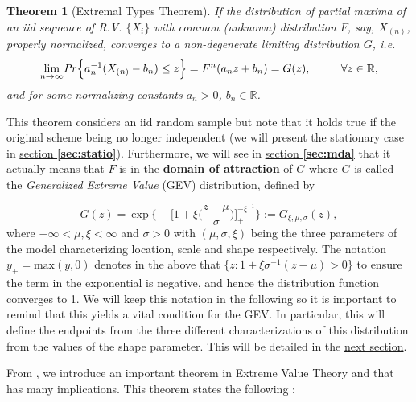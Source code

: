 \documentclass[11pt,a4paper,openany ]{book}
\newtheorem{theorem}{Theorem}[chapter]
\begin{document}
\begin{theorem}[Extremal Types Theorem] \label{extthm}
	If the distribution of partial maxima of an iid sequence of  R.V. $\{X_i\}$ with  common  (unknown)  distribution $F$, say, $X_{(n)}$, properly normalized, converges to a non-degenerate limiting distribution $G$, i.e.
	\begin{equation} \label{exttheom}
	\displaystyle{\lim_{n \to \infty}}\text{\emph{Pr}}\Big\{ a_n^{-1}(X_{(n)}-b_n)\leq z\Big\}=F^n(a_nz+b_n)
	= G(z), \ \ \ \ \ \ \ \ \forall z\in\mathbb{R},
	\end{equation}
	and for some normalizing constants $a_n>0$, $b_n\in\mathbb{R}$.
\end{theorem}
This theorem considers an iid random sample but note that it holds true if the original scheme 
being no longer independent (we will present the stationary case in 
\hyperref[sec:statio]{section \textbf{\ref{sec:statio}}}). %
Furthermore, we will see in \hyperref[sec:mda]{section \textbf{\ref{sec:mda}}} that it actually means that $F$ is in the \textbf{domain of attraction} of $G$ where
$G$ is called the \textit{Generalized Extreme Value} (GEV) distribution, defined by

\begin{equation} \label{gevgen}
G(z)=\ \text{exp}\ \Bigg\{-\bigg[1+\xi\bigg(\frac{z-\mu}{\sigma}\bigg)\bigg]_+^{-\xi^{-1}}\Bigg\}:=G_{\xi,\mu,\sigma}(z),
\end{equation}
where $-\infty<\mu,\xi<\infty$ and $\sigma>0$ with 
$(\mu,\sigma,\xi)$ being the three parameters of the model characterizing location, 
scale and shape respectively. The notation $y_+=\text{max}(y,0)$ denotes in the above that 
$\big\{z:1+\xi\sigma^{-1}(z-\mu)>0\big\}$ to ensure the term in the exponential is negative, and hence the 
distribution function converges to 1. We will keep this notation in the following so it is important to remind that this yields a vital condition for the GEV. In particular, this will define the endpoints from the three different characterizations of this distribution from the values of the shape 
parameter. This will be detailed in the \hyperref[sec:gevdistri]{next 
section}.



From \cite{coles_introduction_2001}, we introduce an important theorem in Extreme Value Theory and that has many implications. This theorem states the following :
\end{document}
